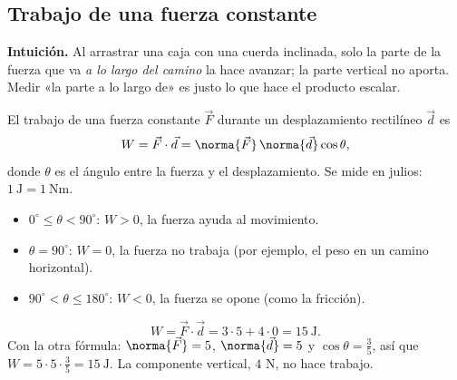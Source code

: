 \documentclass[11pt,a4paper]{article}
\newcommand{\vF}{\vec{F}}\newcommand{\vr}{\vec{r}}\newcommand{\vd}{\vec{d}}\newcommand{\vR}{\vec{R}}
\begin{document}
\subsection{Trabajo de una fuerza constante}
\textbf{Intuición.} Al arrastrar una caja con una cuerda inclinada, solo la parte de la fuerza que va \emph{a lo largo
del camino} la hace avanzar; la parte vertical no aporta. Medir «la parte a lo largo de» es justo lo que hace el
producto escalar.

\begin{definicion}[Trabajo]
El trabajo de una fuerza constante $\vF$ durante un desplazamiento rectilíneo $\vd$ es
\[ W=\vF\cdot\vd=\norma{\vF}\,\norma{\vd}\cos\theta , \]
donde $\theta$ es el ángulo entre la fuerza y el desplazamiento. Se mide en julios: $\SI{1}{\joule}=\SI{1}{\newton\metre}$.
\end{definicion}

\begin{minipage}[c]{0.5\linewidth}
\begin{itemize}
\item $0^\circ\le\theta<90^\circ$: $W>0$, la fuerza ayuda al movimiento.
\item $\theta=90^\circ$: $W=0$, la fuerza no trabaja (por ejemplo, el peso en un camino horizontal).
\item $90^\circ<\theta\le180^\circ$: $W<0$, la fuerza se opone (como la fricción).
\end{itemize}
\end{minipage}\hfill
\begin{minipage}[c]{0.46\linewidth}\centering
{}
\end{minipage}

\begin{ejemplo}[Del video: $\vF=(3,4)$ N y $\vd=(5,0)$ m]
\[ W=\vF\cdot\vd=3\cdot5+4\cdot0=\SI{15}{\joule}. \]
Con la otra fórmula: $\norma{\vF}=5$, $\norma{\vd}=5$ y $\cos\theta=\tfrac35$, así que $W=5\cdot5\cdot\tfrac35=\SI{15}{\joule}$.
La componente vertical, $4$ N, no hace trabajo.
\end{ejemplo}
\end{document}
